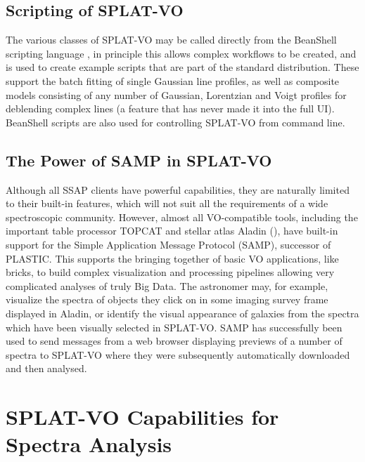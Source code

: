\documentclass[final,authoryear,5p,times,twocolumn]{elsarticle}
\begin{document}
\subsection{Scripting of SPLAT-VO}

The various classes of SPLAT-VO may be called directly from the BeanShell
scripting language \citep{niemeyer2013learning}, in principle this allows
complex workflows to be created, and is used to create example scripts that
are part of the standard distribution. These support the batch fitting of
single Gaussian line profiles, as well as composite models consisting of any
number of Gaussian, Lorentzian and Voigt profiles for deblending complex lines
(a feature that has never made it into the full UI). BeanShell scripts are
also used for controlling SPLAT-VO from command line.


\subsection{The Power of SAMP in SPLAT-VO}

Although all SSAP clients have powerful capabilities, they are naturally
limited to their built-in features, which will not suit all the requirements
of a wide spectroscopic community. However, almost all VO-compatible tools,
including the important table processor TOPCAT and stellar atlas Aladin
(), have built-in support for the Simple Application Message
Protocol (SAMP), successor of PLASTIC. This supports the bringing together of
basic VO applications, like bricks, to build complex visualization and
processing pipelines allowing very complicated analyses of truly Big Data.
The astronomer may, for example, visualize the spectra of objects they click
on in some imaging survey frame displayed in Aladin, or identify the visual
appearance of galaxies from the spectra which have been visually selected in
SPLAT-VO. SAMP has successfully been used to send messages from a web browser
displaying previews of a number of spectra to SPLAT-VO where they were
subsequently automatically downloaded and then analysed.

\section{SPLAT-VO Capabilities  for Spectra Analysis}
\end{document}
